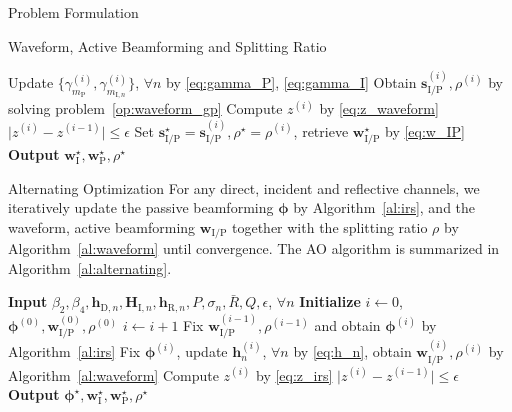 \documentclass[journal]{IEEEtran}
\begin{document}
\begin{section}{Problem Formulation}
\begin{subsection}{Waveform, Active Beamforming and Splitting Ratio}
\begin{algorithm}[!t]
\begin{algorithmic}[1]
						\State Update $\{\gamma_{m_\mathrm{P}}^{(i)},\gamma_{m_{\mathrm{I},n}}^{(i)}\}$, $\forall n$ by \eqref{eq:gamma_P}, \eqref{eq:gamma_I}
						\State Obtain $\boldsymbol{s}_{\mathrm{I/P}}^{(i)},\rho^{(i)}$ by solving problem~\eqref{op:waveform_gp}
						\State Compute $z^{(i)}$ by \eqref{eq:z_waveform}
					\Until $\lvert z^{(i)} - z^{(i-1)} \rvert \le \epsilon$
					\State Set $\boldsymbol{s}_{\mathrm{I/P}}^{\star}=\boldsymbol{s}_{\mathrm{I/P}}^{(i)},\rho^{\star}=\rho^{(i)}$, retrieve $\boldsymbol{w}_{\mathrm{I/P}}^{\star}$ by \eqref{eq:w_IP}
					\State \textbf{Output} $\boldsymbol{w}_{\mathrm{I}}^{\star},\boldsymbol{w}_{\mathrm{P}}^{\star},\rho^{\star}$
				\end{algorithmic}
			\end{algorithm}
		\end{subsection}


		\begin{subsection}{Alternating Optimization}
			For any direct, incident and reflective channels, we iteratively update the passive beamforming $\boldsymbol{\phi}$ by Algorithm~\ref{al:irs}, and the waveform, active beamforming $\boldsymbol{w}_{\mathrm{I/P}}$ together with the splitting ratio $\rho$ by Algorithm~\ref{al:waveform} until convergence. The AO algorithm is summarized in Algorithm~\ref{al:alternating}.
			\begin{algorithm}[!t]
				\caption{AO: Waveform, Active and Passive Beamforming, and Splitting Ratio.}
				\label{al:alternating}
				\begin{algorithmic}[1]
					\State \textbf{Input} $\beta_2,\beta_4,\boldsymbol{h}_{\mathrm{D},n},\boldsymbol{H}_{\mathrm{I},n},\boldsymbol{h}_{\mathrm{R},n},P,\sigma_n,\bar{R},Q,\epsilon$, $\forall n$
					\State \textbf{Initialize} $i \gets 0$, $\boldsymbol{\phi}^{(0)},\boldsymbol{w}_{\mathrm{I/P}}^{(0)},\rho^{(0)}$
					\Repeat
						\State $i \gets i + 1$
						\State Fix $\boldsymbol{w}_{\mathrm{I/P}}^{(i-1)},\rho^{(i-1)}$ and obtain $\boldsymbol{\phi}^{(i)}$ by Algorithm~\ref{al:irs}
						\State Fix $\boldsymbol{\phi}^{(i)}$, update $\boldsymbol{h}_n^{(i)}$, $\forall n$ by \eqref{eq:h_n}, obtain $\boldsymbol{w}_{\mathrm{I/P}}^{(i)}, \rho^{(i)}$ by Algorithm~\ref{al:waveform}
						\State Compute $z^{(i)}$ by \eqref{eq:z_irs}
					\Until $\lvert z^{(i)} - z^{(i-1)} \rvert \le \epsilon$
					\State \textbf{Output} $\boldsymbol{\phi}^{\star},\boldsymbol{w}_{\mathrm{I}}^{\star},\boldsymbol{w}_{\mathrm{P}}^{\star},\rho^{\star}$
				\end{algorithmic}
			\end{algorithm}
		\end{subsection}



\end{section}
\end{document}

